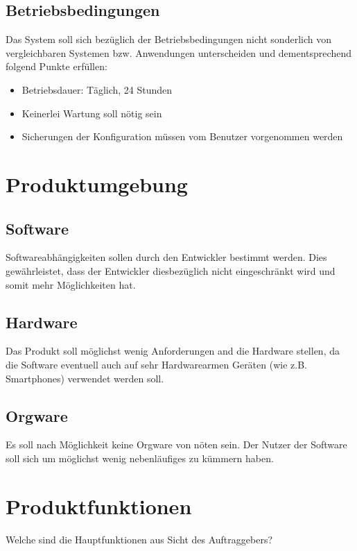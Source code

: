 \subsection{Betriebsbedingungen}
Das System soll sich bezüglich der Betriebsbedingungen nicht sonderlich von vergleichbaren Systemen bzw.
Anwendungen unterscheiden und dementsprechend folgend Punkte erfüllen:
\begin{itemize}
        \item Betriebsdauer: Täglich, 24 Stunden
        \item Keinerlei Wartung soll nötig sein
        \item Sicherungen der Konfiguration müssen vom Benutzer vorgenommen werden
\end{itemize}
\section{Produktumgebung}
\subsection{Software}
Softwareabhängigkeiten sollen durch den Entwickler bestimmt werden.
Dies gewährleistet, dass der Entwickler diesbezüglich nicht eingeschränkt wird
und somit mehr Möglichkeiten hat.
\subsection{Hardware}
Das Produkt soll möglichst wenig Anforderungen and die Hardware stellen, da
die Software eventuell auch auf sehr Hardwarearmen Geräten (wie z.B. Smartphones)
verwendet werden soll.
\subsection{Orgware}
Es soll nach Möglichkeit keine Orgware von nöten sein. Der Nutzer der Software soll sich
um möglichst wenig nebenläufiges zu kümmern haben.
\section{Produktfunktionen}
Welche sind die Hauptfunktionen aus Sicht des Auftraggebers?
